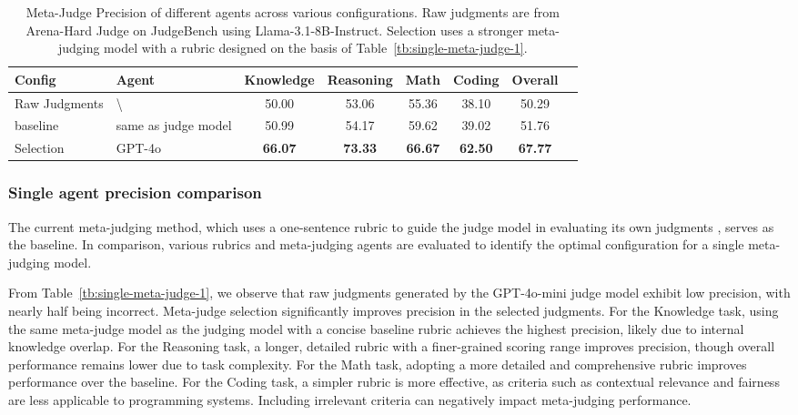 \documentclass{article}
\theoremstyle{plain}
\theoremstyle{definition}
\theoremstyle{remark}
\begin{document}
\begin{table}[ht]
\centering
\begin{tabular}{llcccccc}
\toprule
\textbf{Config} &\textbf{Agent} & \textbf{Knowledge} & \textbf{Reasoning} & \textbf{Math} & \textbf{Coding} & \textbf{Overall} \\
\midrule
Raw Judgments & \textbackslash & 50.00& 53.06 & 55.36& 38.10 &50.29 \\
baseline & same as judge model& 50.99& 54.17& 59.62& 39.02& 51.76 \\
Selection &GPT-4o & \textbf{66.07}&\textbf{73.33} &\textbf{66.67} & \textbf{62.50} & \textbf{67.77}\\
\bottomrule
\end{tabular}
\caption{Meta-Judge Precision of different agents across various configurations. Raw judgments are from Arena-Hard Judge on JudgeBench using Llama-3.1-8B-Instruct. Selection uses a stronger meta-judging model with a rubric designed on the basis of Table~\ref{tb:single-meta-judge-1}.}
\label{tb:single-meta-judge-2}
\end{table}

\subsubsection{Single agent precision comparison}
The current meta-judging method, which uses a one-sentence rubric to guide the judge model in evaluating its own judgments \cite{14-wu2024meta}, serves as the baseline. In comparison, various rubrics and meta-judging agents are evaluated to identify the optimal configuration for a single meta-judging model.

From Table~\ref{tb:single-meta-judge-1}, we observe that raw judgments generated by the GPT-4o-mini judge model exhibit low precision, with nearly half being incorrect. Meta-judge selection significantly improves precision in the selected judgments.
For the Knowledge task, using the same meta-judge model as the judging model with a concise baseline rubric achieves the highest precision, likely due to internal knowledge overlap.
For the Reasoning task, a longer, detailed rubric with a finer-grained scoring range improves precision, though overall performance remains lower due to task complexity.
For the Math task, adopting a more detailed and comprehensive rubric improves performance over the baseline.
For the Coding task, a simpler rubric is more effective, as criteria such as contextual relevance and fairness are less applicable to programming systems. Including irrelevant criteria can negatively impact meta-judging performance.
\end{document}
